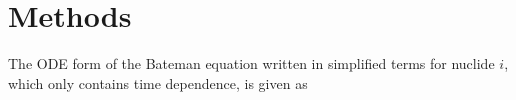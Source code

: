 \documentclass{style/nseJournal}
\begin{document}




\section{Methods}


The ODE form of the Bateman equation written in simplified terms for nuclide $i$, which only contains time dependence, is given as
\end{document}
